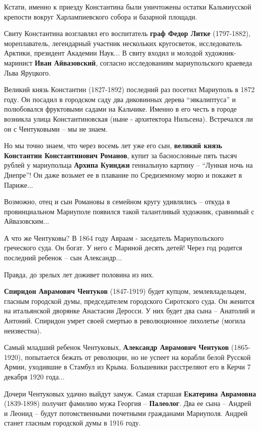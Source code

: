 Кстати, именно к приезду Константина были уничтожены остатки Кальмиусской
крепости вокруг Харлампиевского собора и базарной площади.

Свиту Константина возглавлял его воспитатель \textbf{граф Федор Литке} (1797-1882),
мореплаватель, легендарный участник нескольких кругосветок, исследователь
Арктики, президент Академии Наук... В свиту входил и молодой художник-маринист
\textbf{Иван Айвазовский}, согласно исследованиям мариупольского краеведа Льва Яруцкого.

Великий князь Константин (1827-1892) последний раз посетил Мариуполь в 1872
году. Он посадил в городском саду два диковинных дерева \enquote{эвкалиптуса} и
полюбовался фруктовыми садами на Кальчике. Именно в его честь в городе возникла
улица Константиновская (ныне - архитектора Нильсена). Встречался ли он с
Чентуковыми – мы не знаем.

Но мы точно знаем, что через восемь лет уже его сын, \textbf{великий князь Константин
Константинович Романов}, купит за баснословные пять тысяч рублей у мариупольца
\textbf{Архипа Куинджи} гениальную картину – \enquote{Лунная ночь на Днепре}! Он даже возьмет ее
в плавание по Средиземному морю и покажет в Париже... 

Возможно, отец и сын Романовы в семейном кругу удивлялись – откуда в
провинциальном Мариуполе появился такой талантливый художник, сравнимый с
Айвазовским...

А что же Чентуковы? В 1864 году Авраам - заседатель Мариупольского греческого
суда. Он богат. У него с Мариной десять детей! Через год родится последний
ребенок – сын Александр...

Правда, до зрелых лет доживет половина из них.

\textbf{Спиридон Аврамович Чентуков} (1847-1919) будет купцом, землевладельцем, гласным
городской думы, председателем городского Сиротского суда. Он женится на
итальянской дворянке Анастасии Деросси. У них будет два сына – Анатолий и
Антоний. Спиридон умрет своей смертью в революционное лихолетье (могила
неизвестна).

Самый младший ребенок Чентуковых, \textbf{Александр Аврамович Чентуков} (1865-1920),
попытается бежать от революции, но не успеет на корабли белой Русской Армии,
уходившие в Стамбул из Крыма. Большевики расстреляют его в Керчи 7 декабря 1920
года...

Дочери Чентуковых удачно выйдут замуж. Самая старшая \textbf{Екатерина Аврамовна}
(1839-1898) получит фамилию мужа Георгия – \textbf{Палеолог}. Два ее сына – Андрей и
Леонид – будут потомственными почетными гражданами Мариуполя. Андрей станет
гласным городской думы в 1916 году. 

